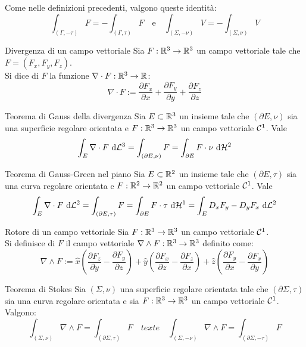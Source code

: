 \documentclass{article}
\begin{document}
\begin{remark}{}{}
    Come nelle definizioni precedenti, valgono queste identità:
    \[\int_{(\Gamma,-\tau)} F = - \int_{(\Gamma,\tau)} F \quad \text{e} \quad \int_{(\Sigma,-\nu)} V = - \int_{(\Sigma,\nu)} V\]
\end{remark}

\begin{definition}{Divergenza di un campo vettoriale}{}
    Sia $F:\mathbb{R}^3 \to \mathbb{R}^3$ un campo vettoriale tale che $F = (F_x, F_y, F_z)$.\\
    Si dice  di $F$ la funzione $\nabla \cdot F : \mathbb{R}^3 \to \mathbb{R}$:
    \[\nabla \cdot F := \frac{\partial F_x}{\partial x} + \frac{\partial F_y}{\partial y} + \frac{\partial F_z}{\partial z}\]
\end{definition}

\begin{theorem}{Teorema di Gauss della divergenza}{}
    Sia $E\subset \mathbb{R}^3$ un insieme tale che $(\partial E, \nu)$ sia una superficie regolare orientata e $F:\mathbb{R}^3 \to \mathbb{R}^3$ un campo vettoriale $\mathcal{C}^1$. Vale
    \[\int_E \nabla \cdot F \text{ d} \mathcal{L}^3 = \int_{(\partial E, \nu)} F = \int_{\partial E} F \cdot \nu \text{ d} \mathcal{H}^2 \]
\end{theorem}

\begin{theorem}{Teorema di Gauss-Green nel piano}{}
    Sia $E \subset \mathbb{R}^2$ un insieme tale che $(\partial E, \tau)$ sia una curva regolare orientata e $F : \mathbb{R}^2 \to \mathbb{R}^2$ un campo vettoriale $\mathcal{C}^1$. Vale
    \[\int_E \nabla \cdot F \text{ d} \mathcal{L}^2 = \int_{(\partial E, \tau)} F = \int_{\partial E} F \cdot \tau \text{ d} \mathcal{H}^1 = \int_E D_xF_y - D_yF_x \text{ d} \mathcal{L}^2\]
\end{theorem}

\begin{definition}{Rotore di un campo vettoriale}{}
    Sia $F:\mathbb{R}^3 \to \mathbb{R}^3$ un campo vettoriale $\mathcal{C}^1$.\\
    Si definisce  di $F$ il campo vettoriale $\nabla \wedge F : \mathbb{R}^3 \to \mathbb{R}^3$ definito come:
    \[\nabla \wedge F := \hat{x}\left(\frac{\partial F_z}{\partial y} - \frac{\partial F_y}{\partial z} \right) + \hat{y}\left( \frac{\partial F_x}{\partial z} - \frac{\partial F_z}{\partial x} \right) + \hat{z}\left(\frac{\partial F_y}{\partial x} - \frac{\partial F_x}{\partial y}\right)\]
\end{definition}

\begin{theorem}{Teorema di Stokes}{}
    Sia $(\Sigma,\nu)$ una superficie regolare orientata tale che $(\partial\Sigma,\tau)$ sia una curva regolare orientata e sia $F:\mathbb{R}^3 \to \mathbb{R}^3$ un campo vettoriale $\mathcal{C}^1$. Valgono:
    \[\int_{(\Sigma,\nu)} \nabla \wedge F = \int_{(\partial\Sigma,\tau)} F \quad text{e} \quad \int_{(\Sigma,-\nu)} \nabla \wedge F = \int_{(\partial\Sigma,-\tau)} F\]
\end{theorem}
\end{document}
